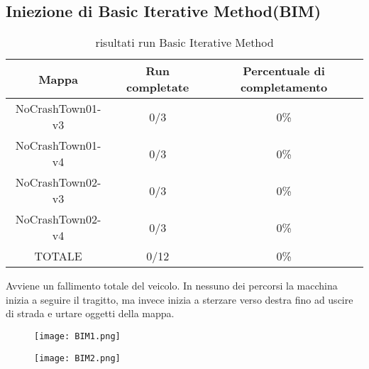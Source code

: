 \subsection{Iniezione di Basic Iterative Method(BIM)}
\begin{table}[h!]
    \begin{tabular}{|c|c|c|}
        \hline
        Mappa                   & Run completate & Percentuale di completamento\\
        \hline
        NoCrashTown01-v3        & 0/3            & 0\% \\
        NoCrashTown01-v4        & 0/3            & 0\% \\
        NoCrashTown02-v3        & 0/3            & 0\% \\
        NoCrashTown02-v4        & 0/3            & 0\%  \\
        TOTALE                  & 0/12           & 0\% \\
        \hline
    \end{tabular}
    \caption{risultati run Basic Iterative Method}
    \label{tab:bim}
\end{table}
Avviene un fallimento totale del veicolo. In nessuno dei percorsi la macchina inizia a seguire il tragitto, ma invece inizia a sterzare verso destra fino ad uscire di strada
e  urtare oggetti della mappa.
\begin{figure}[h]
    \centering
    \parbox{6cm}{
    \texttt{[image: BIM1.png]}
    \label{fig:bim1}}
    \qquad
    \begin{minipage}{6cm}
    \texttt{[image: BIM2.png]}
    \label{fig:bim2}
    \end{minipage}
    \label{fig:bimrun}
    \end{figure}
